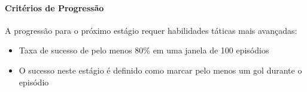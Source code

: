 \paragraph{Critérios de Progressão}

A progressão para o próximo estágio requer habilidades táticas mais avançadas:
\begin{itemize}
    \item Taxa de sucesso de pelo menos 80\% em uma janela de 100 episódios
    \item O sucesso neste estágio é definido como marcar pelo menos um gol durante o episódio
\end{itemize}







